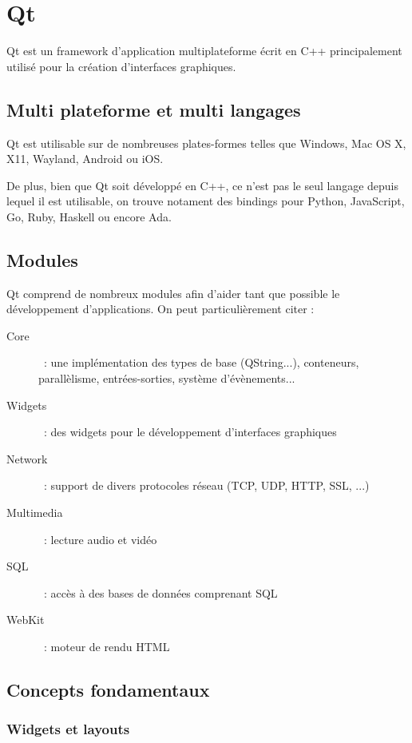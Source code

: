 \section{Qt}

Qt est un framework d'application multiplateforme écrit en C++ principalement utilisé pour la création d'interfaces graphiques.

\subsection{Multi plateforme et multi langages}

Qt est utilisable sur de nombreuses plates-formes telles que Windows, Mac OS X, X11, Wayland, Android ou iOS.

De plus, bien que Qt soit développé en C++, ce n'est pas le seul langage depuis lequel il est utilisable, on trouve notament des bindings pour Python, JavaScript, Go, Ruby, Haskell ou encore Ada.

\subsection{Modules}

Qt comprend de nombreux modules afin d'aider tant que possible le développement d'applications.
On peut particulièrement citer :
\begin{description}
	\item[Core]~: une implémentation des types de base (QString...), conteneurs, parallèlisme, entrées-sorties, système d'évènements...
	\item[Widgets]~: des widgets pour le développement d'interfaces graphiques
	\item[Network]~: support de divers protocoles réseau (TCP, UDP, HTTP, SSL, ...)
	\item[Multimedia]~: lecture audio et vidéo
	\item[SQL]~: accès à des bases de données comprenant SQL
	\item[WebKit]~: moteur de rendu HTML
\end{description}

\subsection{Concepts fondamentaux}

\subsubsection{Widgets et layouts}

